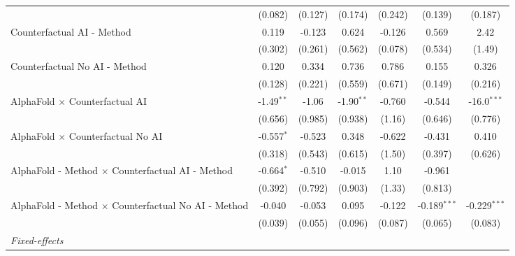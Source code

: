 \begin{tabular}{lcccccc}
                                                              & (0.082)       & (0.127)      & (0.174)      & (0.242)      & (0.139)        & (0.187)\\   
   Counterfactual AI - Method                                 & 0.119         & -0.123       & 0.624        & -0.126       & 0.569          & 2.42\\   
                                                              & (0.302)       & (0.261)      & (0.562)      & (0.078)      & (0.534)        & (1.49)\\   
   Counterfactual No AI - Method                              & 0.120         & 0.334        & 0.736        & 0.786        & 0.155          & 0.326\\   
                                                              & (0.128)       & (0.221)      & (0.559)      & (0.671)      & (0.149)        & (0.216)\\   
   AlphaFold $\times$ Counterfactual AI                       & -1.49$^{**}$  & -1.06        & -1.90$^{**}$ & -0.760       & -0.544         & -16.0$^{***}$\\   
                                                              & (0.656)       & (0.985)      & (0.938)      & (1.16)       & (0.646)        & (0.776)\\   
   AlphaFold $\times$ Counterfactual No AI                    & -0.557$^{*}$  & -0.523       & 0.348        & -0.622       & -0.431         & 0.410\\   
                                                              & (0.318)       & (0.543)      & (0.615)      & (1.50)       & (0.397)        & (0.626)\\   
   AlphaFold - Method $\times$ Counterfactual AI - Method     & -0.664$^{*}$  & -0.510       & -0.015       & 1.10         & -0.961         &   \\   
                                                              & (0.392)       & (0.792)      & (0.903)      & (1.33)       & (0.813)        &   \\   
   AlphaFold - Method $\times$ Counterfactual No AI - Method  & -0.040        & -0.053       & 0.095        & -0.122       & -0.189$^{***}$ & -0.229$^{***}$\\   
                                                              & (0.039)       & (0.055)      & (0.096)      & (0.087)      & (0.065)        & (0.083)\\   
   \midrule
   \emph{Fixed-effects}\\

\end{tabular}
